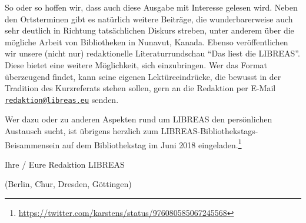 \documentclass[a4paper,
fontsize=11pt,
oneside,
numbers=noperiodatend,
parskip=half-,
bibliography=totoc,
final
]{scrartcl}
\begin{document}
So oder so hoffen wir, dass auch diese Ausgabe mit Interesse gelesen
wird. Neben den Ortsterminen gibt es natürlich weitere Beiträge, die
wunderbarerweise auch sehr deutlich in Richtung tatsächlichen Diskurs
streben, unter anderem über die mögliche Arbeit von Bibliotheken in
Nunavut, Kanada. Ebenso veröffentlichen wir unsere (nicht nur)
redaktionelle Literaturrundschau \enquote{Das liest die LIBREAS}. Diese
bietet eine weitere Möglichkeit, sich einzubringen. Wer das Format
überzeugend findet, kann seine eigenen Lektüreeindrücke, die bewusst in
der Tradition des Kurzreferats stehen sollen, gern an die Redaktion per
E-Mail
\href{mailto:redaktion@libreas.eu}{\nolinkurl{redaktion@libreas.eu}}
senden.

Wer dazu oder zu anderen Aspekten rund um LIBREAS den persönlichen
Austausch sucht, ist übrigens herzlich zum
LIBREAS-Bibliothekstags-Beisammensein auf dem Bibliothekstag im Juni
2018 eingeladen.\footnote{\url{https://twitter.com/karstens/status/976080585067245568}}

Ihre / Eure Redaktion LIBREAS

(Berlin, Chur, Dresden, Göttingen)

\end{document}
